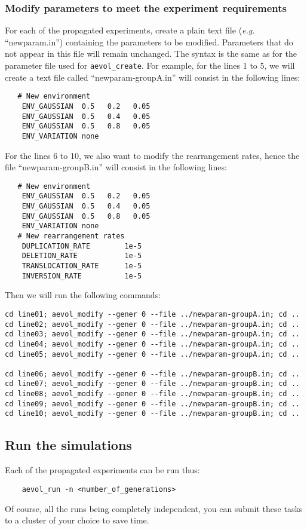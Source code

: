\subsubsection{Modify parameters to meet the experiment requirements}
For each of the propagated experiments, create a plain text file (\emph{e.g.} ``newparam.in'') containing the parameters to be modified. Parameters that do not appear in this file will remain unchanged. The syntax is the same as for the parameter file used for \verb?aevol_create?. For example, for the lines 1 to 5, we will create a text file called ``newparam-groupA.in'' will consist in the following lines:
\begin{verbatim}
   # New environment
    ENV_GAUSSIAN  0.5   0.2   0.05
    ENV_GAUSSIAN  0.5   0.4   0.05
    ENV_GAUSSIAN  0.5   0.8   0.05
    ENV_VARIATION none
\end{verbatim}
 For the lines 6 to 10, we also want to modify the rearrangement rates, hence the file ``newparam-groupB.in'' will consist in the following lines:
\begin{verbatim}
   # New environment
    ENV_GAUSSIAN  0.5   0.2   0.05
    ENV_GAUSSIAN  0.5   0.4   0.05
    ENV_GAUSSIAN  0.5   0.8   0.05
    ENV_VARIATION none
   # New rearrangement rates
    DUPLICATION_RATE        1e-5
    DELETION_RATE           1e-5
    TRANSLOCATION_RATE      1e-5
    INVERSION_RATE          1e-5
\end{verbatim}
Then we will run the following commands:
\begin{verbatim}
cd line01; aevol_modify --gener 0 --file ../newparam-groupA.in; cd ..
cd line02; aevol_modify --gener 0 --file ../newparam-groupA.in; cd ..
cd line03; aevol_modify --gener 0 --file ../newparam-groupA.in; cd ..
cd line04; aevol_modify --gener 0 --file ../newparam-groupA.in; cd ..
cd line05; aevol_modify --gener 0 --file ../newparam-groupA.in; cd ..

cd line06; aevol_modify --gener 0 --file ../newparam-groupB.in; cd ..
cd line07; aevol_modify --gener 0 --file ../newparam-groupB.in; cd ..
cd line08; aevol_modify --gener 0 --file ../newparam-groupB.in; cd ..
cd line09; aevol_modify --gener 0 --file ../newparam-groupB.in; cd ..
cd line10; aevol_modify --gener 0 --file ../newparam-groupB.in; cd ..
\end{verbatim}



\subsection{Run the simulations}
Each of the propagated experiments can be run thus:
\begin{verbatim}
	aevol_run -n <number_of_generations>
\end{verbatim}
Of course, all the runs being completely independent, you can submit these tasks to a cluster of your choice to save time.


